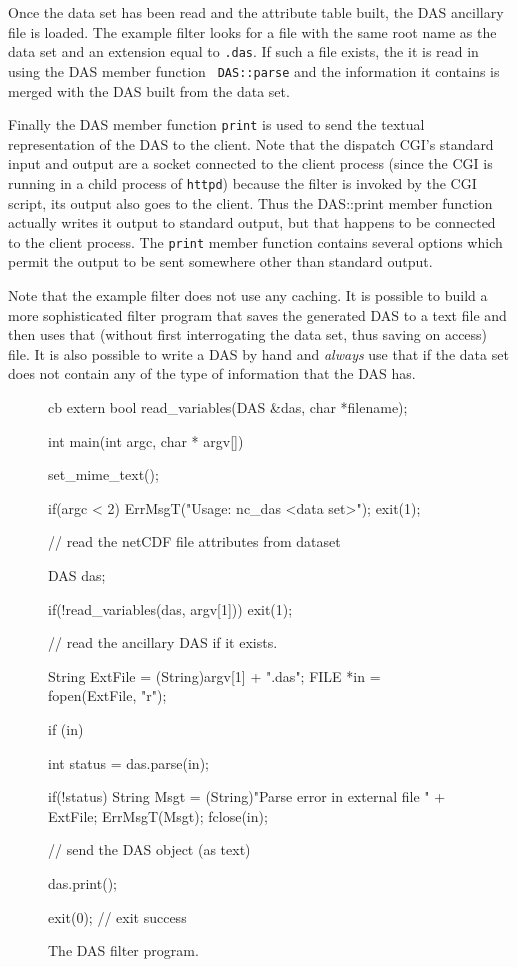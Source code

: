 Once the data set has been read and the attribute table built, the DAS
ancillary file is loaded. The example filter looks for a file with the same
root name as the data set and an extension equal to {\tt .das}. If such a
file exists, the it is read in using the DAS member function {\tt
  DAS::parse} and the information it contains is merged with the DAS built
from the data set. 

Finally the DAS member function {\tt print} is used to send the textual
representation of the DAS to the client. Note that the dispatch CGI's
standard input and output are a socket connected to the client process (since
the CGI is running in a child process of {\tt httpd}) because the filter is
invoked by the CGI script, its output also goes to the client. Thus the
DAS::print member function actually writes it output to standard output, but
that happens to be connected to the client process. The {\tt print}
member function contains several options which permit the output to be sent
somewhere other than standard output.

Note that the example filter does not use any caching. It is possible to
build a more sophisticated filter program that saves the generated DAS to a
text file and then uses that (without first interrogating the data set, thus
saving on access) file. It is also possible to write a DAS by hand and {\em
  always\/} use that if the data set does not contain any of the type of
information that the DAS has.

\begin{figure}
\begin{code}{cb}
extern bool read_variables(DAS &das, char *filename);

int 
main(int argc, char * argv[])
{
    set_mime_text();

    if(argc < 2) {
        ErrMsgT("Usage: nc_das <data set>");
        exit(1);
    }

    // read the netCDF file attributes from dataset

    DAS das;

    if(!read_variables(das, argv[1])){
        exit(1);
    }

    // read the ancillary DAS if it exists.

    String ExtFile = (String)argv[1] + ".das";
    FILE *in = fopen(ExtFile, "r");
 
    if (in) {
        int status = das.parse(in);

        if(!status) {
            String Msgt = (String)"Parse error in external file " + ExtFile;
            ErrMsgT(Msgt);
        }
        fclose(in);
    }

    // send the DAS object (as text)

    das.print();

    exit(0);                    // exit success
}
\end{code}
\caption{The DAS filter program.}
\label{fig:das-filter}
\end{figure}

